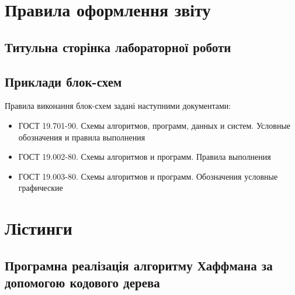 \chapter{Правила оформлення звіту}
\section{Титульна сторінка лабораторної роботи}

\section{Приклади блок-схем}
Правила виконання блок-схем задані наступними документами:
\begin{itemize}
\item ГОСТ 19.701-90. Схемы алгоритмов, программ, данных и систем. Условные обозначения и правила выполнения
\item ГОСТ 19.002-80. Схемы алгоритмов и программ. Правила выполнения
\item ГОСТ 19.003-80. Схемы алгоритмов и программ. Обозначения условные графические

\end{itemize}


\chapter{Лістинги}
\section{Програмна реалізація алгоритму Хаффмана за допомогою кодового дерева}

